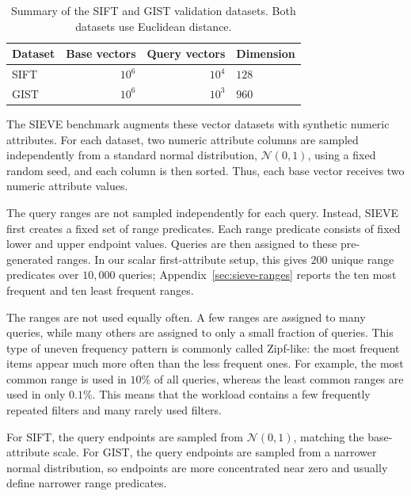 \begin{table}[H]
    \centering
    \renewcommand{\arraystretch}{1.15}
    \begin{tabular}{lrrl}
        \toprule
        Dataset & Base vectors & Query vectors & Dimension \\
        \midrule
        \textsc{SIFT} & \(10^6\) & \(10^4\) & \(128\) \\
        \textsc{GIST} & \(10^6\) & \(10^3\) & \(960\) \\
        \bottomrule
    \end{tabular}
    \caption{Summary of the \textsc{SIFT} and \textsc{GIST} validation datasets. Both datasets use Euclidean distance.}
    \label{tab:sieve-dataset-summary}
\end{table}

The SIEVE benchmark augments these vector datasets with synthetic numeric attributes.
For each dataset, two numeric attribute columns are sampled independently from a standard normal distribution, \(\mathcal{N}(0,1)\), using a fixed random seed, and each column is then sorted.
Thus, each base vector receives two numeric attribute values.

The query ranges are not sampled independently for each query.
Instead, SIEVE first creates a fixed set of range predicates.
Each range predicate consists of fixed lower and upper endpoint values.
Queries are then assigned to these pre-generated ranges.
In our scalar first-attribute setup, this gives \(200\) unique range predicates over \(10{,}000\) queries; Appendix~\ref{sec:sieve-ranges} reports the ten most frequent and ten least frequent ranges.

The ranges are not used equally often.
A few ranges are assigned to many queries, while many others are assigned to only a small fraction of queries.
This type of uneven frequency pattern is commonly called Zipf-like: the most frequent items appear much more often than the less frequent ones.
For example, the most common range is used in \(10\%\) of all queries, whereas the least common ranges are used in only \(0.1\%\).
This means that the workload contains a few frequently repeated filters and many rarely used filters.

For \textsc{SIFT}, the query endpoints are sampled from \(\mathcal{N}(0,1)\), matching the base-attribute scale.
For \textsc{GIST}, the query endpoints are sampled from a narrower normal distribution, so endpoints are more concentrated near zero and usually define narrower range predicates.

